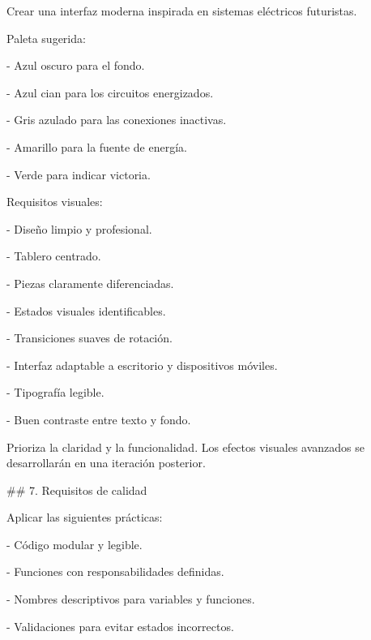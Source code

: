 \par\smallskip
\noindent Crear una interfaz moderna inspirada en sistemas eléctricos futuristas.\par
\par\smallskip
\noindent Paleta sugerida:\par
\par\smallskip
\noindent - Azul oscuro para el fondo.\par
\noindent - Azul cian para los circuitos energizados.\par
\noindent - Gris azulado para las conexiones inactivas.\par
\noindent - Amarillo para la fuente de energía.\par
\noindent - Verde para indicar victoria.\par
\par\smallskip
\noindent Requisitos visuales:\par
\par\smallskip
\noindent - Diseño limpio y profesional.\par
\noindent - Tablero centrado.\par
\noindent - Piezas claramente diferenciadas.\par
\noindent - Estados visuales identificables.\par
\noindent - Transiciones suaves de rotación.\par
\noindent - Interfaz adaptable a escritorio y dispositivos móviles.\par
\noindent - Tipografía legible.\par
\noindent - Buen contraste entre texto y fondo.\par
\par\smallskip
\noindent Prioriza la claridad y la funcionalidad. Los efectos visuales avanzados se desarrollarán en una iteración posterior.\par
\par\smallskip
\noindent \#\# 7. Requisitos de calidad\par
\par\smallskip
\noindent Aplicar las siguientes prácticas:\par
\par\smallskip
\noindent - Código modular y legible.\par
\noindent - Funciones con responsabilidades definidas.\par
\noindent - Nombres descriptivos para variables y funciones.\par
\noindent - Validaciones para evitar estados incorrectos.\par
